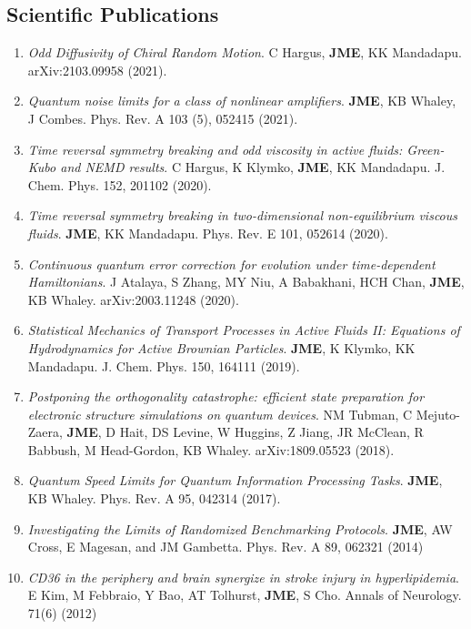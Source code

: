 \documentclass[]{article}
\begin{document}
\subsection*{Scientific Publications}
\begin{enumerate}
\item \textit{Odd Diffusivity of Chiral Random Motion}. C Hargus, \textbf{JME}, KK Mandadapu. arXiv:2103.09958 (2021).

\item\textit{Quantum noise limits for a class of nonlinear amplifiers}. \textbf{JME}, KB Whaley, J Combes. Phys. Rev. A 103 (5), 052415 (2021).

\item \textit{Time reversal symmetry breaking and odd viscosity in active fluids: Green-Kubo and NEMD results}. C Hargus, K Klymko, \textbf{JME}, KK Mandadapu.  J. Chem. Phys. 152, 201102 (2020).

\item \textit{Time reversal symmetry breaking in two-dimensional non-equilibrium viscous fluids}. \textbf{JME}, KK Mandadapu. Phys. Rev. E 101, 052614 (2020).

\item \textit{Continuous quantum error correction for evolution under time-dependent Hamiltonians}. J Atalaya, S Zhang, MY Niu, A Babakhani, HCH Chan, \textbf{JME}, KB Whaley. 	arXiv:2003.11248 (2020).

\item  \textit{Statistical Mechanics of Transport Processes in Active Fluids II: Equations of Hydrodynamics for Active Brownian Particles}. \textbf{JME}, K Klymko, KK Mandadapu. J. Chem. Phys. 150, 164111 (2019).

\item \textit{Postponing the orthogonality catastrophe: efficient state preparation for electronic structure simulations on quantum devices}. NM Tubman, C Mejuto-Zaera, \textbf{JME}, D Hait, DS Levine, W Huggins, Z Jiang, JR McClean, R Babbush, M Head-Gordon, KB Whaley.	arXiv:1809.05523 (2018).



\item \textit{Quantum Speed Limits for Quantum Information Processing Tasks}. \textbf{JME}, KB Whaley. Phys. Rev. A 95, 042314 (2017).

\item \textit{Investigating the Limits of Randomized Benchmarking Protocols}. \textbf{JME}, AW Cross, E Magesan, and JM Gambetta. 
Phys. Rev. A 89, 062321 (2014) 

\item \textit{CD36 in the periphery and brain
	synergize in stroke injury in hyperlipidemia}. E Kim, M Febbraio, Y Bao, AT Tolhurst, \textbf{JME}, S Cho.  Annals of Neurology. 71(6) (2012)
\end{enumerate}
\end{document}
